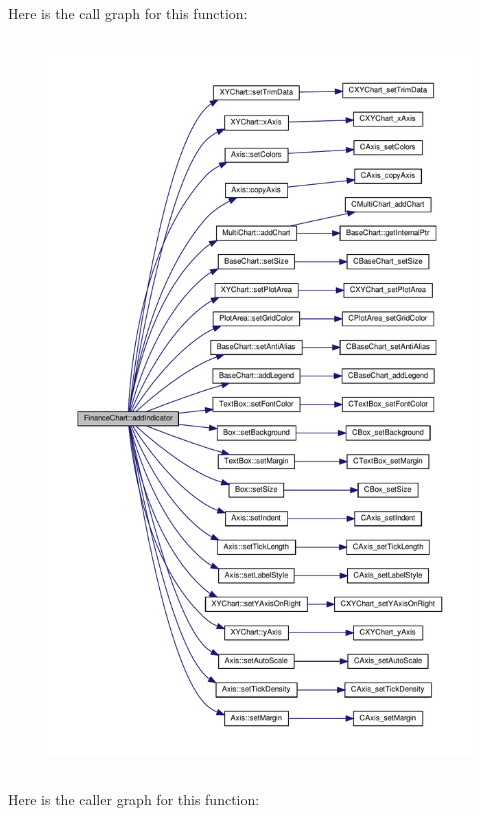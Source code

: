 Here is the call graph for this function\+:
\nopagebreak
\begin{figure}[H]
\begin{center}
\leavevmode
\includegraphics[height=550pt]{class_finance_chart_a2e27a54f9787005383604fe1ebac4c58_cgraph}
\end{center}
\end{figure}
Here is the caller graph for this function\+:
\nopagebreak
